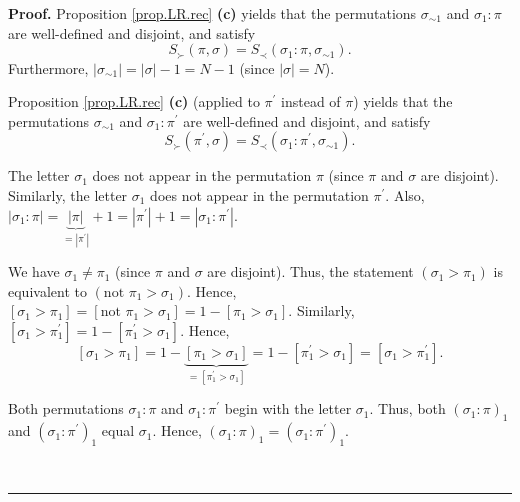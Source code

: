 \documentclass[numbers=enddot,12pt,final,onecolumn,notitlepage]{scrartcl}%
\theoremstyle{definition}
\newenvironment{proof}[1][Proof]{\noindent\textbf{#1.} }{\ \rule{0.5em}{0.5em}}
\begin{document}
\begin{proof}
Proposition \ref{prop.LR.rec} \textbf{(c)} yields that the permutations
$\sigma_{\sim1}$ and $\sigma_{1}:\pi$ are well-defined and disjoint, and
satisfy%
\begin{equation}
S_{\succ}\left(  \pi,\sigma\right)  =S_{\prec}\left(  \sigma_{1}:\pi
,\sigma_{\sim1}\right)  . \label{pf.thm.head-comp.LRcomp.c1.pf.1}%
\end{equation}
Furthermore, $\left\vert \sigma_{\sim1}\right\vert =\left\vert \sigma
\right\vert -1=N-1$ (since $\left\vert \sigma\right\vert =N$).

Proposition \ref{prop.LR.rec} \textbf{(c)} (applied to $\pi^{\prime}$ instead
of $\pi$) yields that the permutations $\sigma_{\sim1}$ and $\sigma_{1}%
:\pi^{\prime}$ are well-defined and disjoint, and satisfy%
\begin{equation}
S_{\succ}\left(  \pi^{\prime},\sigma\right)  =S_{\prec}\left(  \sigma_{1}%
:\pi^{\prime},\sigma_{\sim1}\right)  . \label{pf.thm.head-comp.LRcomp.c1.pf.2}%
\end{equation}


The letter $\sigma_{1}$ does not appear in the permutation $\pi$ (since $\pi$
and $\sigma$ are disjoint). Similarly, the letter $\sigma_{1}$ does not appear
in the permutation $\pi^{\prime}$. Also, $\left\vert \sigma_{1}:\pi\right\vert
=\underbrace{\left\vert \pi\right\vert }_{=\left\vert \pi^{\prime}\right\vert
}+1=\left\vert \pi^{\prime}\right\vert +1=\left\vert \sigma_{1}:\pi^{\prime
}\right\vert $.

We have $\sigma_{1}\neq\pi_{1}$ (since $\pi$ and $\sigma$ are disjoint). Thus,
the statement $\left(  \sigma_{1}>\pi_{1}\right)  $ is equivalent to $\left(
\text{not }\pi_{1}>\sigma_{1}\right)  $. Hence, $\left[  \sigma_{1}>\pi
_{1}\right]  =\left[  \text{not }\pi_{1}>\sigma_{1}\right]  =1-\left[  \pi
_{1}>\sigma_{1}\right]  $. Similarly, $\left[  \sigma_{1}>\pi_{1}^{\prime
}\right]  =1-\left[  \pi_{1}^{\prime}>\sigma_{1}\right]  $. Hence,%
\[
\left[  \sigma_{1}>\pi_{1}\right]  =1-\underbrace{\left[  \pi_{1}>\sigma
_{1}\right]  }_{=\left[  \pi_{1}^{\prime}>\sigma_{1}\right]  }=1-\left[
\pi_{1}^{\prime}>\sigma_{1}\right]  =\left[  \sigma_{1}>\pi_{1}^{\prime
}\right]  .
\]


Both permutations $\sigma_{1}:\pi$ and $\sigma_{1}:\pi^{\prime}$ begin with
the letter $\sigma_{1}$. Thus, both $\left(  \sigma_{1}:\pi\right)  _{1}$ and
$\left(  \sigma_{1}:\pi^{\prime}\right)  _{1}$ equal $\sigma_{1}$. Hence,
$\left(  \sigma_{1}:\pi\right)  _{1}=\left(  \sigma_{1}:\pi^{\prime}\right)
_{1}$.


\end{proof}
\end{document}
